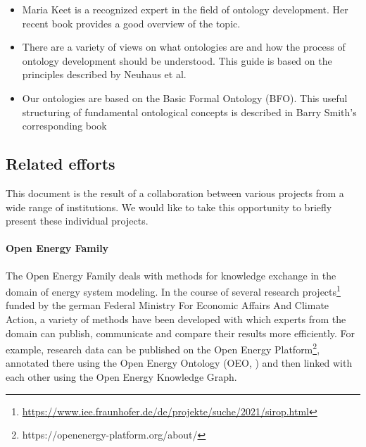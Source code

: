 
\begin{itemize}
    \item Maria Keet is a recognized expert in the field of ontology development. Her recent book provides a good overview of the topic. \cite{keet2018introduction}
    \item There are a variety of views on what ontologies are and how the process of ontology development should be understood. This guide is based on the principles described by Neuhaus et al. \cite{Neuhaus2022OntologyDI}
    \item Our ontologies are based on the Basic Formal Ontology (BFO). This useful structuring of fundamental ontological concepts is described in Barry Smith's corresponding book \cite{bfo-book}
\end{itemize}

\subsection{Related efforts}

This document is the result of a collaboration between various projects from a wide range of institutions. We would like to take this opportunity to briefly present these individual projects.

\paragraph{Open Energy Family}

The Open Energy Family deals with methods for knowledge exchange in the domain of energy system modeling. In the course of several research projects\footnote{\url{https://www.iee.fraunhofer.de/de/projekte/suche/2021/sirop.html}} funded by the german Federal Ministry For Economic Affairs And Climate Action, a variety of methods have been developed with which experts from the domain can publish, communicate and compare their results more efficiently. For example, research data can be published on the Open Energy Platform\footnote{https://openenergy-platform.org/about/}, annotated there using the Open Energy Ontology (OEO, \cite{oeo2021}) and then linked with each other using the Open Energy Knowledge Graph.


